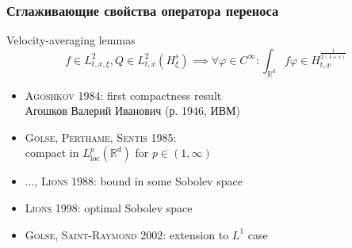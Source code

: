 \documentclass[mathserif]{beamer} %
\newcommand{\Cite}[2][]{\alert{\textsc{#2 #1}}}
\renewcommand{\phi}{\varphi}
\begin{document}
\begin{frame}
    \frametitle{Сглаживающие свойства оператора переноса}
    {\centering Velocity-averaging lemmas}
    \begin{equation*}
        f\in L^2_{t,x,\xi}, Q\in L^2_{t,x}(H_\xi^s) \implies
            \forall\phi\in C^\infty: \int_{\mathbb{R}^d} f\phi\in H_{t,x}^{\frac1{2(1+s)}}
    \end{equation*}
    \begin{itemize}
        \item \Cite[1984]{Agoshkov}: first compactness result \\
            {\footnotesize Агошков Валерий Иванович (р. 1946, ИВМ)}
        \item \Cite[1985]{Golse, Perthame, Sentis}:\\compact in \(L_\mathrm{loc}^p(\mathbb{R}^d)\) for \(p\in(1,\infty)\)
        \item \Cite[1988]{..., Lions}: bound in some Sobolev space
        \item \Cite[1998]{Lions}: optimal Sobolev space
        \item \Cite[2002]{Golse, Saint-Raymond}: extension to \(L^1\) case
    \end{itemize}
\end{frame}
\end{document}
